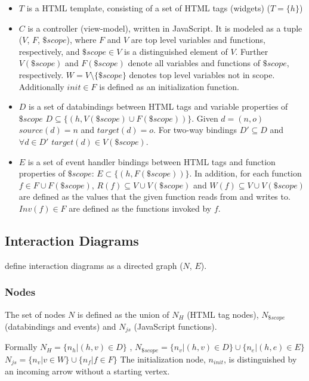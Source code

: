 \begin{itemize}
  \item $T$ is a HTML template, consisting of a set of HTML tags (widgets) ($T = \{h\}$)
  \item 
  $C$ is a controller (view-model), written in JavaScript. It is modeled as a tuple ($V$, $F$, $\$scope$), where $F$ and $V$ are top level variables and functions, respectively, and $\$scope \in V$ is a distinguished element of $V$. Further $V(\$scope)$ and $F(\$scope)$ denote all variables and functions of $\$scope$, respectively. $W = V \setminus \{\$scope\}$ denotes top level variables not in scope. Additionally $init \in F$ is defined as an initialization function.
  \item $D$ is a set of \Glspl{databinding} between HTML tags and variable properties of $\$scope$ $ D \subseteq \{(h,V(\$scope) \cup F(\$scope))\}$. Given $d = (n,o)$ $source(d) = n$ and $target(d) = o$. For two-way bindings $D' \subseteq D$ and $\forall d \in D'$ $target(d) \in V(\$scope)$.
  \item $E$ is a set of event handler bindings between HTML tags and function properties of $\$scope$: $E \subset \{(h,F(\$scope))\}$. In addition, for each function $f \in F \cup F(\$scope)$, $R(f) \subseteq V \cup V(\$scope)$ and $W(f) \subseteq V \cup V(\$scope)$ are defined as the values that the given function reads from and writes to. $Inv(f) \in F $ are defined as the functions invoked by $f$. \parencite{zhang2019scenario}
\end{itemize}
\subsection{Interaction Diagrams}
\label{intro:zhang_interaction_diagrams}
\textcite{zhang2019scenario} define interaction diagrams as a directed graph ($N$, $E$). 

\subsubsection{Nodes}
The set of nodes $N$ is defined as the union of $N_H$ (HTML tag nodes), $N_{\$scope}$ (databindings and events) and  $N_{js}$ (JavaScript functions). 

Formally $N_H = \{n_h | (h,v) \in D\}$ , $N_{\$scope} = \{n_v | (h,v) \in D\} \cup \{n_e | (h,e) \in E\}$ 
$N_{js} = \{n_v | v \in W\} \cup \{n_f | f \in F\} $ The initialization node, $n_{init}$, is distinguished by an incoming arrow without a starting vertex.

